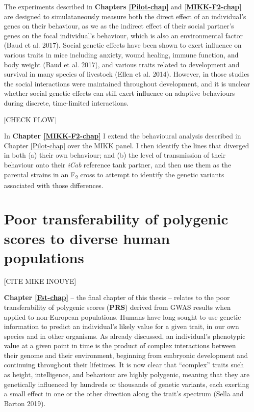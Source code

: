 \documentclass[
]{book}
\begin{document}
The experiments described in \textbf{Chapters \ref{Pilot-chap}} and \textbf{\ref{MIKK-F2-chap}} are designed to simulataneously measure both the direct effect of an individual's genes on their behaviour, as we as the indirect effect of their social partner's genes on the focal individual's behaviour, which is also an environmental factor (Baud et al. 2017). Social genetic effects have been shown to exert influence on various traits in mice including anxiety, wound healing, immune function, and body weight (Baud et al. 2017), and various traits related to development and survival in many species of livestock (Ellen et al. 2014). However, in those studies the social interactions were maintained throughout development, and it is unclear whether social genetic effects can still exert influence on adaptive behaviours during discrete, time-limited interactions.

{[}CHECK FLOW{]}

In \textbf{Chapter \ref{MIKK-F2-chap}} I extend the behavioural analysis described in Chapter \ref{Pilot-chap} over the MIKK panel. I then identify the lines that diverged in both (a) their own behaviour; and (b) the level of transmission of their behaviour onto their \emph{\textcolor{iCab_424B4D}{iCab}} reference tank partner, and then use them as the parental strains in an F\textsubscript{2} cross to attempt to identify the genetic variants associated with those differences.

\hypertarget{poor-transferability-of-polygenic-scores-to-diverse-human-populations}{%
\section{Poor transferability of polygenic scores to diverse human populations}\label{poor-transferability-of-polygenic-scores-to-diverse-human-populations}}

{[}CITE MIKE INOUYE{]}

\textbf{Chapter \ref{Fst-chap}} -- the final chapter of this thesis -- relates to the poor transferability of polygenic scores (\textbf{PRS}) derived from GWAS results when applied to non-European populations. Humans have long sought to use genetic information to predict an individual's likely value for a given trait, in our own species and in other organisms. As already discussed, an individual's phenotypic value at a given point in time is the product of complex interactions between their genome and their environment, beginning from embryonic development and continuing throughout their lifetimes. It is now clear that ``complex'' traits such as height, intelligence, and behaviour are highly polygenic, meaning that they are genetically influenced by hundreds or thousands of genetic variants, each exerting a small effect in one or the other direction along the trait's spectrum (Sella and Barton 2019).
\end{document}
